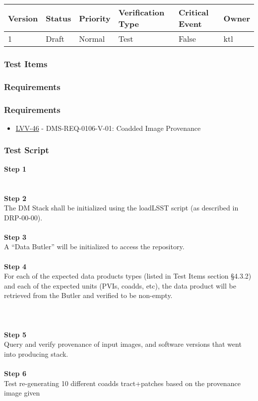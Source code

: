 \begin{longtable}[]{@{}llllll@{}}
\toprule
Version & Status & Priority & Verification Type & Critical Event &
Owner\tabularnewline
\midrule
\endhead
1 & Draft & Normal & Test & False & ktl\tabularnewline
\bottomrule
\end{longtable}

\hypertarget{test-items-8}{%
\subsubsection{Test Items}\label{test-items-8}}

\hypertarget{requirements-16}{%
\subsubsection{Requirements}\label{requirements-16}}

\hypertarget{requirements-17}{%
\subsubsection{Requirements}\label{requirements-17}}

\begin{itemize}
\tightlist
\item
  \href{https://jira.lsstcorp.org/browse/LVV-46}{LVV-46} -
  DMS-REQ-0106-V-01: Coadded Image Provenance
\end{itemize}

\hypertarget{test-script-8}{%
\subsubsection{Test Script}\label{test-script-8}}

\textbf{Step 1}\\
~\\
~\\
\textbf{Step 2}\\
The DM Stack shall be initialized using the loadLSST script (as
described in DRP-00-00).\\
~\\
\textbf{Step 3}\\
A ``Data Butler'' will be initialized to access the repository.\\
~\\
\textbf{Step 4}\\
For each of the expected data products types (listed in Test Items
section §4.3.2) and each of the expected units (PVIs, coadds, etc), the
data product will be retrieved from the Butler and verified to be
non-empty.\\
~\\
~\\
~\\
\textbf{Step 5}\\
Query and verify provenance of input images, and software versions that
went into producing stack.\\
~\\
\textbf{Step 6}\\
Test re-generating 10 different coadds tract+patches based on the
provenance image given\\
~\\

